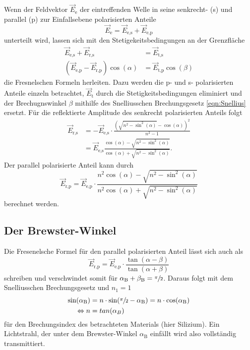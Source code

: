 Wenn der Feldvektor $\vec{E}_\text{e}$ der eintreffenden Welle in seine senkrecht- (s) und parallel (p) zur Einfallsebene polarisierten Anteile 
\begin{equation*}
    \vec{E}_\text{e} = \vec{E}_\text{e,s} + \vec{E}_\text{e,p}
\end{equation*}
unterteilt wird, lassen sich mit den Stetigekeitsbedingungen an der Grenzfläche
\begin{align*}
    \vec{E}_\text{e,s} + \vec{E}_\text{r,s} &= \vec{E}_\text{t,s} \\
    \left(\vec{E}_\text{e,p} - \vec{E}_\text{r,p}\right) \cos(\alpha) &= \vec{E}_\text{t,p} \cos(\beta)
\end{align*}
die Fresnelschen Formeln herleiten. Dazu werden die p- und s- polarisierten Anteile einzeln betrachtet, $\vec{E}_\text{t}$ durch die 
Stetigkeitsbedingungen eliminiert und der Brechugnswinkel $\beta$ mithilfe des Snelliusschen Brechungsgesetz \eqref{eqn:Snellius} ersetzt. 
Für die reflektierte Amplitude des senkrecht polarisierten Anteils folgt
\begin{align}
    \label{eqn:Fresnel_senkrecht}
    \vec{E}_\text{r,s} &= -\vec{E}_\text{e,s} \cdot \frac{\left(\sqrt{n^2 - \sin^2(\alpha)} -\cos(\alpha)\right)^2}{n^2 - 1} \nonumber \\
    &= \vec{E}_\text{e,s} \frac{\cos(\alpha)- \sqrt{n^2 - \sin^2(\alpha)}}{\cos(\alpha) + \sqrt{n^2 - \sin^2(\alpha)}}.
\end{align}
Der parallel polarisierte Anteil kann durch
\begin{equation}
    \label{eqn:Fresnel_parallel}
    \vec{E}_\text{r,p} = \vec{E}_\text{e,p} \cdot \frac{n^2 \cos(\alpha) - \sqrt{n^2 - \sin^2(\alpha)}}{n^2 \cos(\alpha) + \sqrt{n^2 - \sin^2(\alpha)}}
\end{equation}
berechnet werden.

\subsection{Der Brewster-Winkel}
\label{subsec:T_Brewster}
Die Fresenelsche Formel für den parallel polarisierten Anteil lässt sich auch als 
\begin{equation*}
    \vec{E}_\text{r,p} = \vec{E}_\text{e,p} \cdot \frac{\tan(\alpha - \beta)}{\tan(\alpha + \beta)}
\end{equation*}
schreiben und verschwindet somit für $\alpha_\text{B} + \beta_\text{B} = \sfrac{\pi}{2}$. Daraus folgt mit dem Snelliusschen Brechungsgesetz und $n_1 = 1$
\begin{align}
    \sin(\alpha_\text{B}) &= n \cdot \sin(\sfrac{\pi}{2} - \alpha_\text{B}) = n \cdot \cos(\alpha_\text{B}) \nonumber \\
    \Leftrightarrow n &= tan(\alpha_B)
    \label{eqn:Brewster}
\end{align}
für den Brechungsindex des betrachteten Materials (hier Silizium).
Ein Lichtstrahl, der unter dem Brewster-Winkel $\alpha_\text{B}$ einfällt wird also vollständig transmittiert.
